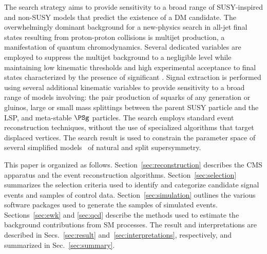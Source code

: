 The search strategy aims to provide sensitivity to a broad range of
SUSY-inspired and non-SUSY models that predict the existence of a DM
candidate. The overwhelmingly dominant background for a new-physics
search in all-jet final states resulting from proton-proton collisions
is multijet production, a manifestation of quantum
chromodynamics. Several dedicated variables are employed to suppress
the multijet background to a negligible level while maintaining low
kinematic thresholds and high experimental acceptance to final states
characterized by the presence of significant \ptvecmiss. Signal
extraction is performed using several additional kinematic variables
to provide sensitivity to a broad range of models involving: the pair
production of squarks of any generation or gluinos, large or small
mass splittings between the parent SUSY particle and the LSP, and
meta-stable $\PSg$ particles. The search employs standard event
reconstruction techniques, without the use of specialized algorithms
that target displaced vertices. The search result is used to constrain
the parameter space of several simplified models~\cite{Alwall:2008ag,
  Alwall:2008va, sms} of natural and split supersymmetry. 


This paper is organized as follows. Section~\ref{sec:reconstruction}
describes the CMS apparatus and the event reconstruction
algorithms. Section~\ref{sec:selection} summarizes the selection
criteria used to identify and categorize candidate signal events and
samples of control data. Section~\ref{sec:simulation} outlines the
various software packages used to generate the samples of simulated
events. Sections~\ref{sec:ewk} and \ref{sec:qcd} describe the methods
used to estimate the background contributions from SM processes. The
result and interpretations are described in Secs.~\ref{sec:result}
and~\ref{sec:interpretations}, respectively, and summarized in
Sec.~\ref{sec:summary}.

